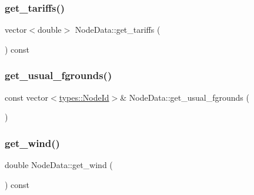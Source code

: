 \mbox{\label{class_node_data_a57ef519f6170d871e72eae0adde81912}} 
\subsubsection{\texorpdfstring{get\_tariffs()}{get\_tariffs()}}
{\footnotesize\ttfamily vector$<$double$>$ Node\+Data\+::get\+\_\+tariffs (\begin{DoxyParamCaption}{ }\end{DoxyParamCaption}) const\hspace{0.3cm}{\ttfamily [inline]}}

\mbox{\label{class_node_data_a280457f06e40d8c6dd86008e9de756b2}} 
\subsubsection{\texorpdfstring{get\_usual\_fgrounds()}{get\_usual\_fgrounds()}}
{\footnotesize\ttfamily const vector$<$\mbox{\hyperlink{classtypes_1_1_node_id}{types\+::\+Node\+Id}}$>$\& Node\+Data\+::get\+\_\+usual\+\_\+fgrounds (\begin{DoxyParamCaption}{ }\end{DoxyParamCaption})\hspace{0.3cm}{\ttfamily [inline]}}

\mbox{\label{class_node_data_aecd2dde5e4c1f3b43cca85cb5b545b86}} 
\subsubsection{\texorpdfstring{get\_wind()}{get\_wind()}}
{\footnotesize\ttfamily double Node\+Data\+::get\+\_\+wind (\begin{DoxyParamCaption}{ }\end{DoxyParamCaption}) const\hspace{0.3cm}{\ttfamily [inline]}}

\mbox{\label{class_node_data_a259535df3dd8738ac27e966a57dcd412}} 
